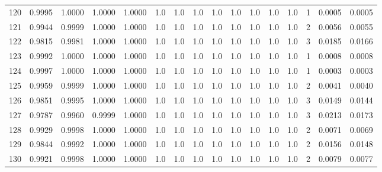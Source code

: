 \begin{tabular}{lrrrrrrrrrrrrrrr}
120 &      0.9995 &  1.0000 &  1.0000 &  1.0000 &     1.0 &     1.0 &     1.0 &     1.0 &     1.0 &     1.0 &      1.0 &        1.0 &      1 &                    0.0005 &                     0.0005 \\
121 &      0.9944 &  0.9999 &  1.0000 &  1.0000 &     1.0 &     1.0 &     1.0 &     1.0 &     1.0 &     1.0 &      1.0 &        1.0 &      2 &                    0.0056 &                     0.0055 \\
122 &      0.9815 &  0.9981 &  1.0000 &  1.0000 &     1.0 &     1.0 &     1.0 &     1.0 &     1.0 &     1.0 &      1.0 &        1.0 &      3 &                    0.0185 &                     0.0166 \\
123 &      0.9992 &  1.0000 &  1.0000 &  1.0000 &     1.0 &     1.0 &     1.0 &     1.0 &     1.0 &     1.0 &      1.0 &        1.0 &      1 &                    0.0008 &                     0.0008 \\
124 &      0.9997 &  1.0000 &  1.0000 &  1.0000 &     1.0 &     1.0 &     1.0 &     1.0 &     1.0 &     1.0 &      1.0 &        1.0 &      1 &                    0.0003 &                     0.0003 \\
125 &      0.9959 &  0.9999 &  1.0000 &  1.0000 &     1.0 &     1.0 &     1.0 &     1.0 &     1.0 &     1.0 &      1.0 &        1.0 &      2 &                    0.0041 &                     0.0040 \\
126 &      0.9851 &  0.9995 &  1.0000 &  1.0000 &     1.0 &     1.0 &     1.0 &     1.0 &     1.0 &     1.0 &      1.0 &        1.0 &      3 &                    0.0149 &                     0.0144 \\
127 &      0.9787 &  0.9960 &  0.9999 &  1.0000 &     1.0 &     1.0 &     1.0 &     1.0 &     1.0 &     1.0 &      1.0 &        1.0 &      3 &                    0.0213 &                     0.0173 \\
128 &      0.9929 &  0.9998 &  1.0000 &  1.0000 &     1.0 &     1.0 &     1.0 &     1.0 &     1.0 &     1.0 &      1.0 &        1.0 &      2 &                    0.0071 &                     0.0069 \\
129 &      0.9844 &  0.9992 &  1.0000 &  1.0000 &     1.0 &     1.0 &     1.0 &     1.0 &     1.0 &     1.0 &      1.0 &        1.0 &      2 &                    0.0156 &                     0.0148 \\
130 &      0.9921 &  0.9998 &  1.0000 &  1.0000 &     1.0 &     1.0 &     1.0 &     1.0 &     1.0 &     1.0 &      1.0 &        1.0 &      2 &                    0.0079 &                     0.0077 \\

\end{tabular}
